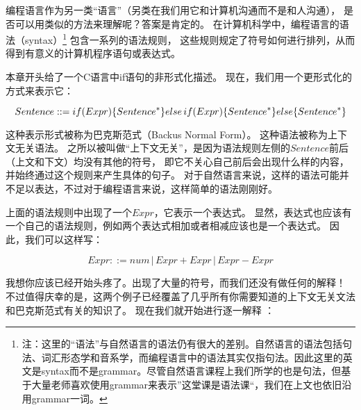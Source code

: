\documentclass[../main.tex]{subfiles}
\begin{document}
  \indent 编程语言作为另一类“语言”（另类在我们用它和计算机沟通而不是和人沟通），
  是否可以用类似的方法来理解呢？答案是肯定的。
  在计算机科学中，编程语言的语法（syntax）\footnote[1]{注：这里的“语法”与自然语言的语法仍有很大的差别。自然语言的语法包括句法、词汇形态学和音系学\cite{grammar}，而编程语言中的语法其实仅指句法。因此这里的英文是syntax而不是grammar。尽管自然语言课程上我们所学的也是句法，但基于大量老师喜欢使用grammar来表示”这堂课是语法课“，我们在上文也依旧沿用grammar一词。}
  包含一系列的语法规则，
  这些规则规定了符号如何进行排列，从而得到有意义的计算机程序语句或表达式。\cite{syntaxwiki}

  \indent 本章开头给了一个C语言中if语句的非形式化描述。
  现在，我们用一个更形式化的方式来表示它：

  $$
  Sentence ::= \\
  if(Expr)\{ Sentence^*\} \\
  else\,if(Expr)\{Sentence^*\} \\
  else\{Sentence^*\}
  $$ %

  \indent 这种表示形式被称为巴克斯范式（Backus Normal Form）。
  这种语法被称为上下文无关语法。\cite{bnfwiki}
  之所以被叫做“上下文无关”，是因为语法规则左侧的$Sentence$前后（上文和下文）均没有其他的符号，
  即它不关心自己前后会出现什么样的内容，并始终通过这个规则来产生具体的句子。\cite{cfgwiki}
  对于自然语言来说，这样的语法可能并不足以表达，不过对于编程语言来说，这样简单的语法刚刚好。

  \indent 上面的语法规则中出现了一个$Expr$，它表示一个表达式。
  显然，表达式也应该有一个自己的语法规则，例如两个表达式相加或者相减应该也是一个表达式。
  因此，我们可以这样写：

  $$Expr ::= num\,|\,Expr + Expr\,|\,Expr - Expr$$

  \indent 我想你应该已经开始头疼了。出现了大量的符号，而我们还没有做任何的解释！
  不过值得庆幸的是，这两个例子已经覆盖了几乎所有你需要知道的上下文无关文法和巴克斯范式有关的知识了。
  现在我们就开始进行逐一解释\cite{bnfwiki} \cite{cfgwiki}：
\end{document}
